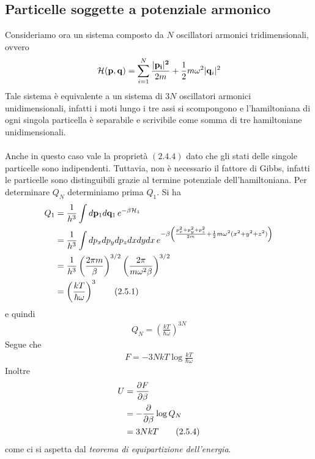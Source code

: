 \documentclass{article}
\begin{document}
\subsection{Particelle soggette a potenziale armonico}
Consideriamo ora un sistema composto da $N$ oscillatori armonici tridimensionali, ovvero 
\begin{align}
    \mathcal{H}(\mathbf{p}, \mathbf{q}) = \sum_{i = 1}^N \frac{|\mathbf{p_i|^2}}{2m} + \frac{1}{2}m\omega^2|\mathbf{q}_i|^2 \notag
\end{align}
Tale sistema è equivalente a un sistema di $3N$ oscillatori armonici unidimensionali, infatti i moti lungo i tre assi si scompongono e l'hamiltoniana di ogni singola particella è separabile e scrivibile come somma di tre hamiltoniane unidimensionali. \\ \\
Anche in questo caso vale la proprietà $(2.4.4)$ dato che gli stati delle singole particelle sono indipendenti. Tuttavia, non è necessario il fattore di Gibbs, infatti le particelle sono distinguibili grazie al termine potenziale dell'hamiltoniana. Per determinare $Q_N$ determiniamo prima $Q_1$. Si ha 
\begin{align}
    Q_1 &= \frac{1}{h^3}\int d\mathbf{p}_1d\mathbf{q}_1 \, e^{-\beta\mathcal{H}_1} \notag \\
    &= \frac{1}{h^3}\int dp_xdp_ydp_zdxdydx \, e^{-\beta\left(\frac{p^2_x + p^2_y + p^2_z}{2m} + \frac{1}{2}m\omega^2(x^2 + y^2 + z^2)\right)} \notag \\
    &= \frac{1}{h^3}\left(\frac{2\pi m}{\beta}\right)^{3/2}\left(\frac{2\pi}{m\omega^2\beta}\right)^{3/2} \notag \\
    &= \left(\frac{kT}{\hbar\omega}\right)^3 \tag{2.5.1}
\end{align}
e quindi 
\begin{align}
    Q_N = \left(\frac{kT}{\hbar\omega}\right)^{3N} \tag{2.5.2}
\end{align}
Segue che 
\begin{align}
    F = -3NkT\log \frac{kT}{\hbar\omega} \tag{2.5.3}
\end{align}
Inoltre 
\begin{align}
    U &= \frac{\partial F}{\partial \beta} \notag \\
    &= -\frac{\partial}{\partial \beta}\log Q_N \notag \\
    &= 3NkT \tag{2.5.4}
\end{align}
come ci si aspetta dal \textit{teorema di equipartizione dell'energia}.
\end{document}
